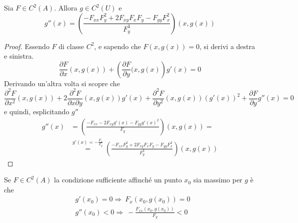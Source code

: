 \begin{theorem}
Sia $F \in C^2(A)$. Allora $g \in C^2(U)$ e
\begin{equation}
    g''(x)= \left(\frac{-F_{xx}F_{y}^2+2F_{xy}F_xF_y-F_{yy}F_x^2}{F_y^3}\right)(x, g(x))
\end{equation}
\end{theorem}
\begin{proof}
Essendo $F$ di classe $C^2$, e sapendo che $F(x,g(x))=0$, si derivi a destra e sinistra.
\begin{equation}
    \frac{\partial{F}}{\partial{x}}(x, g(x))+\left(\frac{\partial{F}}{\partial{y}}(x, g(x)\right)g'(x)=0
\end{equation}
Derivando un'altra volta si scopre che
\begin{equation}
    \frac{\partial^2{F}}{\partial{x^2}}(x, g(x))+ 2 \frac{\partial^2{F}}{\partial{x}\partial{y}}(x, g(x))g'(x) + \frac{\partial^2{F}}{\partial{y^2}}(x, g(x))(g'(x))^2+ \frac{\partial{F}}{\partial{y}}g''(x) =0
\end{equation}
e quindi, esplicitando $g''$
\begin{equation}
\begin{aligned}
    g''(x)&= \left(\frac{-F_{xx}-2F_{xy}g'(x)- F_{yy}g'(x)^2}{F_y}\right)(x, g(x))=\\
    &\overset{g'(x)=-\tfrac{F_x}{F_y}}{=} \left(\frac{-F_{xx}F_{y}^2+2F_{xy}F_xF_y-F_{yy}F_x^2}{F_y^3}\right)(x, g(x))
\end{aligned}
\end{equation}
\end{proof}
\begin{oss}
    Se $F \in C^2(A)$ la condizione sufficiente affinché un punto $x_0$ sia massimo per $g$ è che
    \begin{equation}
        \begin{aligned}
            &g'(x_0)=0 \Rightarrow\ F_x(x_0, g(x_0))=0\\
            &g''(x_0)<0 \Rightarrow\ -\frac{F_{xx}(x_0, g(x_0))}{F_y} < 0
        \end{aligned}
    \end{equation}
\end{oss}
